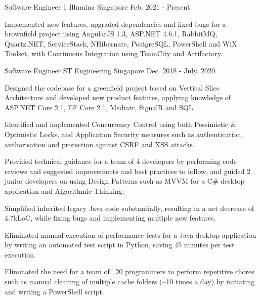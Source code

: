 

\begin{cventries}

\cventry
{Software Engineer 1} %
{Illumina} %
{Singapore} %
{Feb. 2021 - Present} %
{
  \begin{cvitems} %
    \item {Implemented new features, upgraded dependencies and fixed bugs for a brownfield project using AngularJS 1.3, ASP.NET 4.6.1, RabbitMQ, Quartz.NET, ServiceStack, NHibernate, PostgreSQL, PowerShell and WiX Toolset, with Continuous Integration using TeamCity and Artifactory.}
  \end{cvitems}
}

  \cventry
    {Software Engineer} %
    {ST Engineering} %
    {Singapore} %
    {Dec. 2018 - July. 2020} %
    {
      \begin{cvitems} %
        \item {Designed the codebase for a greenfield project based on Vertical Slice Architecture and developed new product features, applying knowledge of ASP.NET Core 2.1, EF Core 2.1, Mediatr, SignalR and SQL.}
        \item {Identified and implemented Concurrency Control using both Pessimistic \& Optimistic Locks, and Application Security measures such as authentication, authorisation and protection against CSRF and XSS attacks.}
        \item {Provided technical guidance for a team of 4 developers by performing code reviews and suggested improvements and best practices to follow, and guided 2 junior developers on using Design Patterns such as MVVM for a C\# desktop application and Algorithmic Thinking.}
        \item {Simplified inherited legacy Java code substantially, resulting in a net decrease of 4.7kLoC, while fixing bugs and implementing multiple new features.}
        \item {Eliminated manual execution of performance tests for a Java desktop application by writing an automated test script in Python, saving 45 minutes per test execution.}
        \item {Eliminated the need for a team of ~20 programmers to perform repetitive chores such as manual cleaning of multiple cache folders (\textasciitilde10 times a day) by initiating and writing a PowerShell script.}
      \end{cvitems}
    }


\end{cventries}
